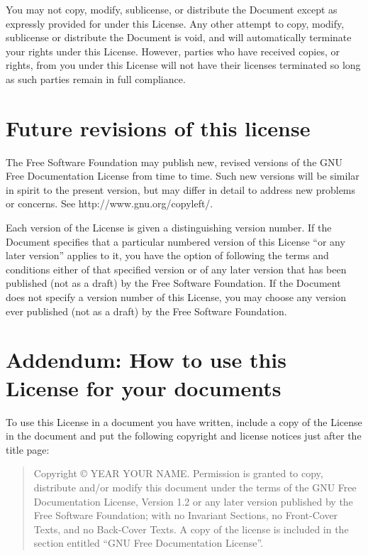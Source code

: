 \documentclass[a4paper,spanish,12pt]{book}
\begin{document}
You may not copy, modify, sublicense, or distribute the Document except
as expressly provided for under this License.  Any other attempt to
copy, modify, sublicense or distribute the Document is void, and will
automatically terminate your rights under this License.  However,
parties who have received copies, or rights, from you under this
License will not have their licenses terminated so long as such
parties remain in full compliance.

\section{Future revisions of this license}

The Free Software Foundation may publish new, revised versions
of the GNU Free Documentation License from time to time.  Such new
versions will be similar in spirit to the present version, but may
differ in detail to address new problems or concerns.  See
http://www.gnu.org/copyleft/.

Each version of the License is given a distinguishing version number.
If the Document specifies that a particular numbered version of this
License ``or any later version'' applies to it, you have the option of
following the terms and conditions either of that specified version or
of any later version that has been published (not as a draft) by the
Free Software Foundation.  If the Document does not specify a version
number of this License, you may choose any version ever published (not
as a draft) by the Free Software Foundation.


\section{Addendum: How to use this License for your documents}

To use this License in a document you have written, include a copy of
the License in the document and put the following copyright and
license notices just after the title page:

\bigskip
\begin{quote}
    Copyright \copyright{}  YEAR  YOUR NAME.
    Permission is granted to copy, distribute and/or modify this document
    under the terms of the GNU Free Documentation License, Version 1.2
    or any later version published by the Free Software Foundation;
    with no Invariant Sections, no Front-Cover Texts, and no Back-Cover Texts.
    A copy of the license is included in the section entitled ``GNU
    Free Documentation License''.
\end{quote}
\bigskip
    
\end{document}

